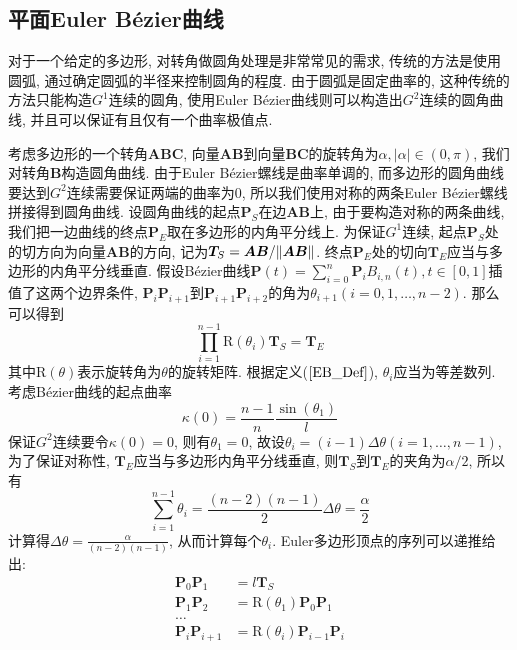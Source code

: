 \documentclass[utf8]{ctexart} %
\numberwithin{figure}{section}
\numberwithin{equation}{section}
\begin{document}
		\subsection{平面Euler B\'{e}zier曲线}
		对于一个给定的多边形, 对转角做圆角处理是非常常见的需求, 传统的方法是使用圆弧, 通过确定圆弧的半径来控制圆角的程度. 由于圆弧是固定曲率的, 这种传统的方法只能构造$G^1$连续的圆角, 使用Euler B\'{e}zier曲线则可以构造出$G^2$连续的圆角曲线, 并且可以保证有且仅有一个曲率极值点.\par
		考虑多边形的一个转角$\boldsymbol{ABC}$, 向量$\boldsymbol{AB}$到向量$\boldsymbol{BC}$的旋转角为$\alpha, |\alpha|\in(0,\pi)$, 我们对转角$\boldsymbol{B}$构造圆角曲线. 由于Euler B\'{e}zier螺线是曲率单调的, 而多边形的圆角曲线要达到$G^2$连续需要保证两端的曲率为0, 所以我们使用对称的两条Euler B\'{e}zier螺线拼接得到圆角曲线. 设圆角曲线的起点$\boldsymbol{P}_S$在边$\boldsymbol{AB}$上, 由于要构造对称的两条曲线, 我们把一边曲线的终点$\boldsymbol{P}_E$取在多边形的内角平分线上. 为保证$G^1$连续, 起点$\boldsymbol{P}_S$处的切方向为向量$\boldsymbol{AB}$的方向, 记为$\boldsymbol{T}_S = \boldsymbol{AB}/\Arrowvert\boldsymbol{AB}\Arrowvert$. 终点$\boldsymbol{P}_E$处的切向$\boldsymbol{T}_E$应当与多边形的内角平分线垂直. 假设B\'ezier曲线$\boldsymbol{P}(t)=\sum_{i=0}^n\boldsymbol{P}_iB_{i,n}(t),t\in[0,1]$插值了这两个边界条件, $\boldsymbol{P}_i\boldsymbol{P}_{i+1}$到$\boldsymbol{P}_{i+1}\boldsymbol{P}_{i+2}$的角为$\theta_{i+1}(i=0,1,\dots,n-2)$. 那么可以得到
		\begin{equation}
			\prod_{i=1}^{n-1}\text{R}(\theta_i)\boldsymbol{T}_S =  \boldsymbol{T}_E
		\end{equation}
		其中$\text{R}(\theta)$表示旋转角为$\theta$的旋转矩阵. 根据定义($\ref{EB_Def}$), $\theta_i$应当为等差数列. 考虑B\'ezier曲线的起点曲率$$\kappa(0)=\frac{n-1}{n}\frac{\sin(\theta_1)}{l}$$
		保证$G^2$连续要令$\kappa(0)=0$, 则有$\theta_1=0$, 故设$\theta_i=(i-1)\Delta\theta(i=1,\dots,n-1)$, 为了保证对称性, $\boldsymbol{T}_E$应当与多边形内角平分线垂直, 则$\boldsymbol{T}_S$到$\boldsymbol{T}_E$的夹角为$\alpha/2$, 所以有
		\begin{equation}
			\sum_{i=1}^{n-1}\theta_i = \frac{(n-2)(n-1)}2\Delta\theta = \frac{\alpha}2
		\end{equation}
		计算得$\Delta\theta=\frac{\alpha}{(n-2)(n-1)}$, 从而计算每个$\theta_i$. Euler多边形顶点的序列可以递推给出:
		\begin{equation}\label{recur}
			\begin{aligned}
				\boldsymbol{P}_0\boldsymbol{P}_1 &=l\boldsymbol{T}_S\\
				\boldsymbol{P}_1\boldsymbol{P}_2 &=\text{R}(\theta_1)\boldsymbol{P}_0\boldsymbol{P}_1\\
				\dots\\
				\boldsymbol{P}_i\boldsymbol{P}_{i+1} &=\text{R}(\theta_i)\boldsymbol{P}_{i-1}\boldsymbol{P}_i
			\end{aligned}
		\end{equation}
\end{document}
